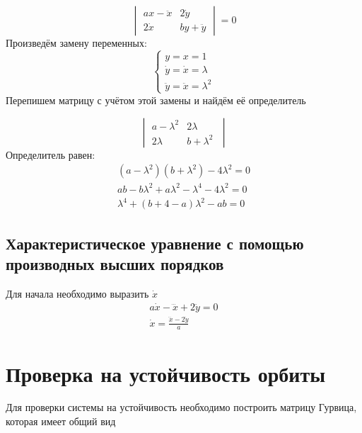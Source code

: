 \documentclass[12pt, a4paper]{article}
\begin{document}
\begin{displaymath}
    \begin{vmatrix}
        ax - \ddot x & 2 \dot y\\
        2 \dot x & by + \ddot y
    \end{vmatrix}
    = 0 
\end{displaymath}
Произведём замену переменных: 
\begin{displaymath}
    \begin{cases}
        y = x = 1 \\
        \dot y = \dot x = \lambda \\
        \ddot y = \ddot x = \lambda^2
    \end{cases}
\end{displaymath}
Перепишем матрицу с учётом этой замены и найдём её определитель

\begin{displaymath}
    \begin{vmatrix}
        a - \lambda^2 & 2 \lambda\;\\
        2 \lambda & b + \lambda^2\;
    \end{vmatrix}
\end{displaymath}
Определитель равен:
\begin{align*}
   (a - \lambda^2)(b + \lambda^2) - 4 \lambda^2 = 0\\
    ab - b \lambda^2 + a \lambda^2 - \lambda^4 - 4 \lambda^2 = 0\\
    \boxed{
    \lambda^4 + (b + 4 - a) \lambda^2 - ab = 0
    }
\end{align*}

\subsection{Характеристическое уравнение с помощью производных высших порядков}

Для начала необходимо выразить $\dot x$
\begin{gather*}
    a \dot x - \dddot x + 2 \ddot y = 0\\
    \dot x = \frac{\dddot x - 2 \ddot y}{a}
\end{gather*}

\section{Проверка на устойчивость орбиты}

Для проверки системы на устойчивость необходимо построить матрицу Гурвица, которая имеет общий вид
\end{document}
